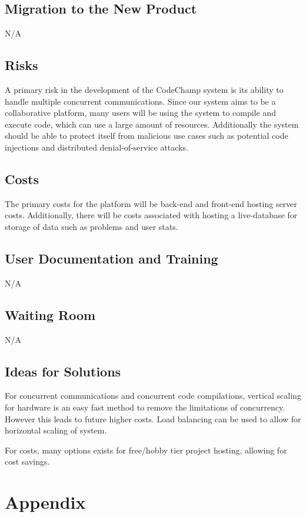 \documentclass[12pt, titlepage]{article}
\begin{document}
\subsection{Migration to the New Product}
N/A

\subsection{Risks}
A primary risk in the development of the CodeChamp system is its ability to handle multiple concurrent communications. Since our system aims to be a collaborative platform, many users will be using the system to compile and execute code, which can use a large amount of resources. Additionally the system should be able to protect itself from malicious use cases such as potential code injections and distributed denial-of-service attacks.

\subsection{Costs}
The primary costs for the platform will be back-end and front-end hosting server costs. Additionally, there will be costs associated with hosting a live-database for storage of data such as problems and user stats.

\subsection{User Documentation and Training}
N/A

\subsection{Waiting Room}
N/A

\subsection{Ideas for Solutions}
For concurrent communications and concurrent code compilations, vertical scaling for hardware is an easy fast method to remove the limitations of concurrency. However this leads to future higher costs. Load balancing can be used to allow for horizontal scaling of system.

For costs, many options exists for free/hobby tier project hosting, allowing for cost savings.

\newpage

\section{Appendix}
\end{document}
